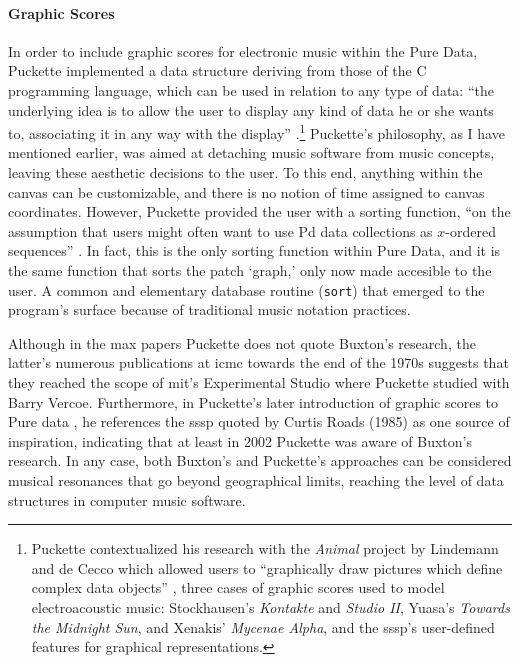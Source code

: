 	\paragraph{Graphic Scores}
	\label{graphic_scores}
	In order to include graphic scores for electronic music within the Pure Data, Puckette implemented a data structure deriving from those of the C programming language, which can be used in relation to any type of data: ``the underlying idea is to allow the user to display any kind of data he or she wants to, associating it in any way with the display'' \parencite[184]{DBLP:conf/icmc/Puckette02}.\footnote{Puckette contextualized his research with the \textit{Animal} project by Lindemann and de Cecco which allowed users to ``graphically draw pictures which define complex data objects'' \parencite{DBLP:conf/icmc/Lindemann90a}, three cases of graphic scores used to model electroacoustic music: Stockhausen's \textit{Kontakte} and \textit{Studio II}, Yuasa's \textit{Towards the Midnight Sun}, and Xenakis' \textit{Mycenae Alpha}, and the \gls{sssp}'s user-defined features for graphical representations.} Puckette's philosophy, as I have mentioned earlier, was aimed at detaching music software from music concepts, leaving these aesthetic decisions to the user. To this end, anything within the canvas can be customizable, and there is no notion of time assigned to canvas coordinates. However, Puckette provided the user with a sorting function, ``on the assumption that users might often want to use Pd data collections as $x$-ordered sequences'' \parencite[185]{DBLP:conf/icmc/Puckette02}. In fact, this is the only sorting function within Pure Data, and it is the same function that sorts the patch `graph,' only now made accesible to the user. A common and elementary database routine (\texttt{sort}) that emerged to the program's surface because of traditional music notation practices.
	
	Although in the \gls{max} papers Puckette does not quote Buxton's research, the latter's numerous publications at \gls{icmc} towards the end of the 1970s suggests that they reached the scope of \gls{mit}'s Experimental Studio where Puckette studied with Barry Vercoe. Furthermore, in Puckette's later introduction of graphic scores to Pure data \parencite{DBLP:conf/icmc/Puckette02} , he references the \gls{sssp} quoted by Curtis Roads (1985) as one source of inspiration, indicating that at least in 2002 Puckette was aware of Buxton's research. In any case, both Buxton's and Puckette's approaches can be considered musical resonances that go beyond geographical limits, reaching the level of data structures in computer music software.

